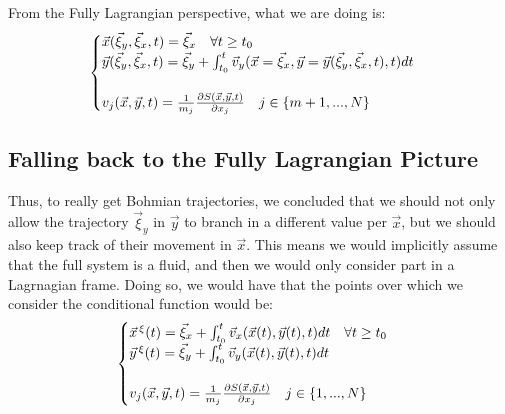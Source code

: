 \documentclass[11pt, a4paper]{article} %
\DeclareRobustCommand{\mybox}[2][gray!10]{%
\begin{tcolorbox}[   %
        left=0.2cm,
        right=0.2cm,
        top=0.15cm,
        bottom=0.15cm,
        colback=#1,
        colframe=#1,
        width=\dimexpr\textwidth\relax, 
        enlarge left by=0mm,
        boxsep=5pt,
        arc=0pt,outer arc=0pt,
        ]
        #2
\end{tcolorbox}
}
\begin{document}
\mybox{
From the Fully Lagrangian perspective, what we are doing is:
\begin{equation}\label{a}
\begin{cases}
\vec{x}(\vec{\xi}_y, \vec{\xi}_x,t)=\vec{\xi}_x \quad \forall t\geq t_0\\
\vec{y}(\vec{\xi}_y, \vec{\xi}_x,t)=\vec{\xi}_y+\int_{t_0}^t \vec{v}_y(\vec{x}=\vec{\xi}_x, \vec{y}=\vec{y}(\vec{\xi}_y, \vec{\xi}_x,t),t)dt\\ \\
v_j(\vec{x}, \vec{y},t)=\frac{1}{m_j}\pdv{S(\vec{x}, \vec{y},t)}{x_j}\quad j\in\{m+1,...,N \}
\end{cases}
\end{equation}


\subsection*{Falling back to the Fully Lagrangian Picture}
Thus, to really get Bohmian trajectories, we concluded that we should not only allow the trajectory $\vec{\xi}_y$ in $\vec{y}$ to branch in a different value per $\vec{x}$, but we should also keep track of their movement in $\vec{x}$. This means we would implicitly assume that the full system is a fluid, and then we would only consider part in a Lagrnagian frame. Doing so, we would have that the points over which we consider the conditional function would be:
\begin{equation}
\begin{cases}\label{b}
\vec{x}^{\, \xi}(t)=\vec{\xi}_x +\int_{t_0}^t \vec{v}_x(\vec{x}(t), \vec{y}(t),t)dt\quad \forall t\geq t_0\\
\vec{y}^{\, \xi}(t)=\vec{\xi}_y+\int_{t_0}^t \vec{v}_y(\vec{x}(t), \vec{y}(t),t)dt\\ \\
v_j(\vec{x}, \vec{y},t)=\frac{1}{m_j}\pdv{S(\vec{x}, \vec{y},t)}{x_j}\quad j\in\{1,...,N \}
\end{cases}
\end{equation}


}
\end{document}
